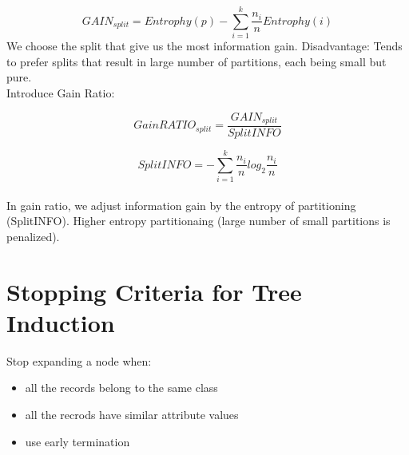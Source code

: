 \begin{multicols}{2}
$$GAIN_{split}=Entrophy(p)-\sum_{i=1}^{k} \frac{n_i}{n}Entrophy(i)$$
\noindent We choose the split that give us the most information gain. Disadvantage: Tends to prefer splits that result in large number of partitions, each being small but pure. \\

\noindent Introduce Gain Ratio: 

$$GainRATIO_{split}=\frac{GAIN_{split}}{SplitINFO}$$

$$SplitINFO=-\sum_{i=1}^{k} \frac{n_i}{n}log_2 \frac{n_i}{n}$$ \\

\noindent In gain ratio, we adjust information gain by the entropy of partitioning (SplitINFO). Higher entropy partitionaing (large number of small partitions is penalized). 

\section{Stopping Criteria for Tree Induction}

Stop expanding a node when:
\begin{itemize}
    \item all the records belong to the same class
    \item all the recrods have similar attribute values
    \item use early termination
\end{itemize}

\end{multicols}
